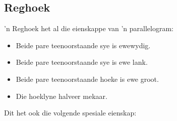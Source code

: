 \subsection{Reghoek}
'n Reghoek het al die eienskappe van 'n parallelogram:
\begin{itemize}[noitemsep]
\item Beide pare teenoorstaande sye is ewewydig.
\item Beide pare teenoorstaande sye is ewe lank.
\item Beide pare teenoorstaande hoeke is ewe groot.
\item Die hoeklyne halveer mekaar.
\end{itemize}
\vspace*{-20pt}
Dit het ook die volgende spesiale eienskap:\vspace*{-20pt}

